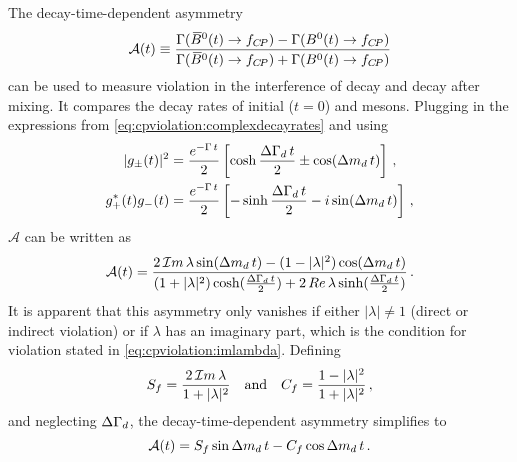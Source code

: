 The decay-time-dependent asymmetry
\begin{equation}
  {\mathcal A}(t) \equiv
    \frac{\Gamma({{\kern 0.18em\overline{\kern -0.18em B}{}}{}^0}(t) \rightarrow f_{{C\!P}}) - \Gamma({{B}^0}(t) \rightarrow f_{{C\!P}})}
         {\Gamma({{\kern 0.18em\overline{\kern -0.18em B}{}}{}^0}(t) \rightarrow f_{{C\!P}}) + \Gamma({{B}^0}(t) \rightarrow f_{{C\!P}})}
\label{eq:cpviolation:asymmetry}
\end{equation}
can be used to measure \CP violation in the interference of decay and decay
after mixing. It compares the decay rates of initial ($t = 0$) \Bdb and \Bd
mesons. Plugging in the expressions from
\cref{eq:cpviolation:complexdecayrates} and using
\begin{align}
\begin{split}
  |g_{\pm}(t)|^2 &= \frac{e^{-\Gamma\,t}}{2}\left[\cosh\frac{{\Delta\Gamma_{{d}}}\,t}{2} \pm \cos({\Delta m_{{d}}}\,t)\right]\,,\\
  g_+^{\ast}(t)g_-(t) &= \frac{e^{-\Gamma\,t}}{2} \left[-\sinh\frac{{\Delta\Gamma_{{d}}}\,t}{2} - i \sin({\Delta m_{{d}}}\,t)\right]\,,
\end{split}
\end{align}
$\mathcal{A}$ can be written as
\begin{align}
  \mathcal{A}(t) = \frac{2\,\mathcal{I}m\,\lambda \sin({\Delta m_{{d}}}\,t) - (1 - |\lambda|^2)\cos({\Delta m_{{d}}}\,t)}{(1 + |\lambda|^2)\cosh(\frac{{\Delta\Gamma_{{d}}}\,t}{2}) + 2\,Re\,\lambda \sinh(\frac{{\Delta\Gamma_{{d}}}\,t}{2})}\,.
\end{align}
It is apparent that this asymmetry only vanishes if either $|\lambda| \neq 1$ (direct
or indirect \CP violation) or if $\lambda$ has an imaginary part, which is the
condition for \CP violation stated in \cref{eq:cpviolation:imlambda}. Defining
\begin{align}
  S_{f} = \frac{2\,\mathcal{I}m\,\lambda}{1 + |\lambda|^2} \quad \text{and} \quad C_{f} = \frac{1 - |\lambda|^2}{1 + |\lambda|^2}\,,
\label{eq:cpviolation:SfCf_general}
\end{align}
and neglecting ${\Delta\Gamma_{{d}}}$, the decay-time-dependent asymmetry simplifies to
\begin{equation}
  \mathcal{A}(t) = S_{f}\sin{\ensuremath{\Delta m_{{d}}}}\,t - C_{f}\cos{\ensuremath{\Delta m_{{d}}}}\,t\,.
\label{eq:cpviolation:simpleasymmetry}
\end{equation}
